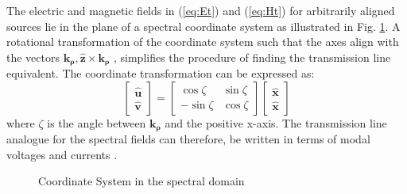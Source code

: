 \documentclass[11pt]{article}
\renewcommand{\v}[1]{\mathbf{#1}} %
\newcommand{\p}{\rho}  %
\newcommand{\x}{\times}  %
\renewcommand{\^}{\hat}  %
\begin{document}
  The electric and magnetic fields in (\ref{eq:Et}) and (\ref{eq:Ht}) for arbitrarily aligned sources lie in the plane of a spectral coordinate system as illustrated in Fig. \ref{fig:SpCS}. A rotational transformation of the coordinate system such that the axes align with the vectors $\v{k_{\p}}, \v{\^z} \x \v{k_{\p}}$ \cite{itoh1980spectral}, simplifies the procedure of finding the transmission line equivalent. The coordinate transformation can be expressed as:
  \begin{equation}
    \left[\begin{array}{c}
    \v{\^u} \\
    \v{\^v}
    \end{array} \right]
    = \left[ \begin{array}{cc}
    \cos \zeta & \sin \zeta \\
    -\sin \zeta & \cos \zeta
    \end{array} \right]
    \left[\begin{array}{c}
    \v{\^x} \\
    \v{\^x}
    \end{array} \right]
    \label{eq:xtion}
  \end{equation}
  where $\zeta$ is the angle between $\v{k_{\p}}$ and the positive x-axis. The transmission line analogue for the spectral fields can therefore, be written in terms of modal voltages and currents \cite{kastner1988spectral, michalski1997multilayered}.

  \begin{figure}[t!]
    \centering
    
    \caption{Coordinate System in the spectral domain \cite[p. 1166]{michalski2005electromagnetic}}
    \label{fig:SpCS}
  \end{figure}
\end{document}

